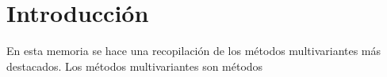 \chapter*{Introducción}

En esta memoria se hace una recopilación de los métodos multivariantes más destacados. 
Los métodos multivariantes son métodos 